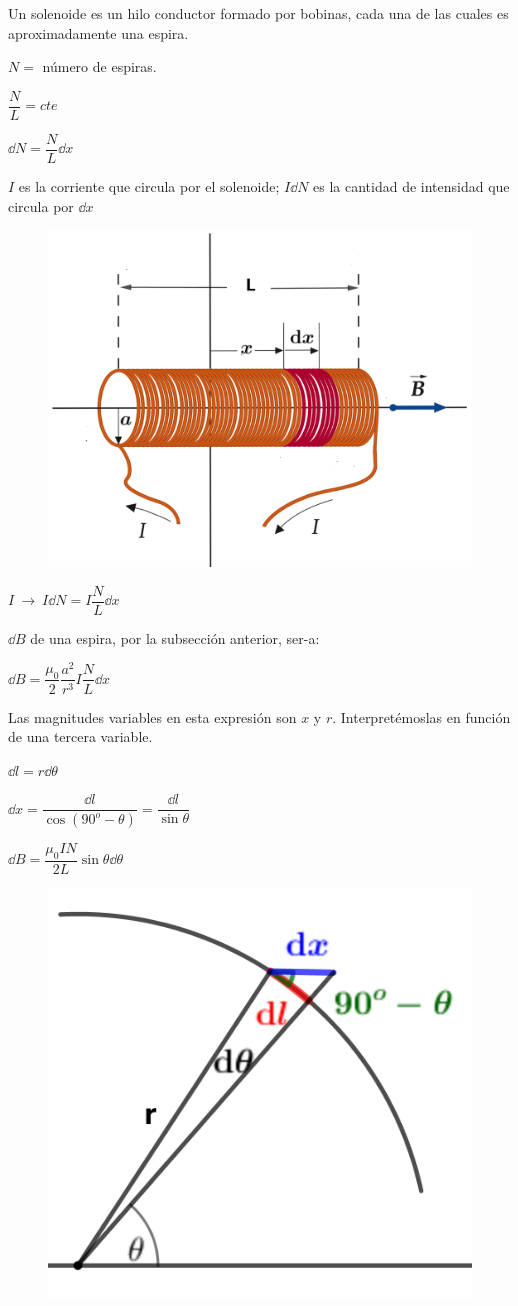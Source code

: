 Un solenoide es un hilo conductor formado por bobinas, cada una de las cuales es aproximadamente una espira.

\begin{multicols}{2}
$N=$ número de espiras.

$\dfrac N L = cte$

$\dd N=\dfrac N L \dd x$

$I$ es la corriente que circula por el solenoide; $I\dd N$ es la cantidad de intensidad que circula por $\dd x$
\begin{figure}[H]
	\centering
	\includegraphics[width=.4\textwidth]{imagenes/imagenes26/T26IM09.png}
	\end{figure}	
\end{multicols}

\vspace{-5mm}%

$ I \ \to \ I \dd N=I\dfrac N L \dd x$

$\dd B$ de una espira, por la subsección anterior, ser-a:

$\dd B=\dfrac{\mu_0}{2} \dfrac{a^2}{r^3} I \dfrac N L \dd x$

Las magnitudes variables en esta expresión son $x$ y $r$. Interpretémoslas en función de una tercera variable.

\begin{multicols}{2}
$\dd l=r \dd \theta$

$\dd x=\dfrac {\dd l}{\cos(90^o-\theta)}=\dfrac {\dd l}{\sin \theta}$

$\dd B=\dfrac {\mu_0 I N}{2L} \sin \theta \dd \theta$ 
\begin{figure}[H]
	\centering
	\includegraphics[width=.2\textwidth]{imagenes/imagenes26/T26IM10.png}
	\end{figure}	
\end{multicols}

